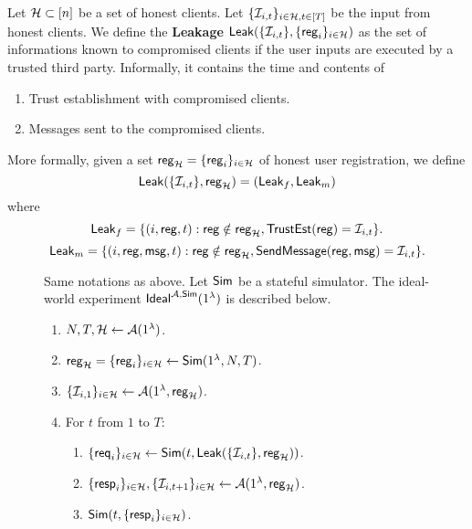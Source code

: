 \begin{definition}[Leakage]
Let $\mathcal{H} \subset [n]$ be a set of honest clients. Let $\{\mathcal{I}_{i, t}\}_{i \in \mathcal{H}, t \in [T]}$ be the input from honest clients. We define the \textbf{Leakage} $\mathsf{Leak}(\{\mathcal{I}_{i, t}\}, \{\mathsf{reg}_{i}\}_{i \in \mathcal{H}})$ as the set of informations known to compromised clients if the user inputs are executed by a trusted third party. Informally, it contains the time and contents of
\begin{enumerate}
    \item Trust establishment with compromised clients.
    \item Messages sent to the compromised clients.
\end{enumerate}
More formally, given a set $\mathsf{reg}_{\mathcal{H}} = \{\mathsf{reg}_{i}\}_{i \in \mathcal{H}}$ of honest user registration, we define
$$\mathsf{Leak}(\{\mathcal{I}_{i, t}\}, \mathsf{reg}_{\mathcal{H}}) = (\mathsf{Leak}_f, \mathsf{Leak}_m)$$
where
$$\mathsf{Leak}_f = \{(i, \mathsf{reg}, t): \mathsf{reg} \notin \mathsf{reg}_{\mathcal{H}}, \mathsf{TrustEst}(\mathsf{reg}) = \mathcal{I}_{i, t}\}.$$
$$\mathsf{Leak}_m = \{(i, \mathsf{reg}, \mathsf{msg}, t): \mathsf{reg} \notin \mathsf{reg}_{\mathcal{H}}, \mathsf{SendMessage}(\mathsf{reg}, \mathsf{msg}) = \mathcal{I}_{i, t}\}.$$
\end{definition}
\begin{figure}[h!]
\begin{framed}
\begin{definition}
\label{defn:ideal-world}
Same notations as above. Let $\mathsf{Sim}$ be a stateful simulator. The ideal-world experiment $\mathsf{Ideal}^{\mathcal{A}, \mathsf{Sim}}(1^{\lambda})$ is described below.
\begin{enumerate}
\item $N, T, \mathcal{H} \leftarrow \mathcal{A}(1^{\lambda})$.
\item $\mathsf{reg}_{\mathcal{H}} = \{\mathsf{reg}_i\}_{i \in \mathcal{H}} \leftarrow \mathsf{Sim}(1^{\lambda}, N, T)$. 
\item $\{\mathcal{I}_{i, 1}\}_{i \in \mathcal{H}} \leftarrow \mathcal{A}(1^{\lambda}, \mathsf{reg}_{\mathcal{H}})$.
\item For $t$ from $1$ to $T$:
    \begin{enumerate}
    \item  $\{\mathsf{req}_i\}_{i \in \mathcal{H}} \leftarrow \mathsf{Sim}(t, \mathsf{Leak}(\{\mathcal{I}_{i, t}\}, \mathsf{reg}_{\mathcal{H}}))$.
    
    \item $\{\mathsf{resp}_i\}_{i \in \mathcal{H}}, \{\mathcal{I}_{i, t + 1}\}_{i \in \mathcal{H}} \leftarrow \mathcal{A}(1^{\lambda}, \mathsf{reg}_{\mathcal{H}})$.
    
    \item $\mathsf{Sim}(t, \{\mathsf{resp}_i\}_{i \in \mathcal{H}})$.
    \end{enumerate}
\end{enumerate}
\end{definition}
\end{framed}
\end{figure}
